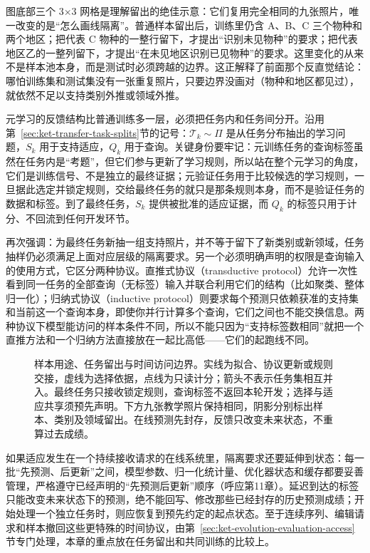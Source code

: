 图底部三个 3×3 网格是理解留出的绝佳示意：它们复用完全相同的九张照片，唯一改变的是“怎么画线隔离”。普通样本留出后，训练里仍含 A、B、C 三个物种和两个地区；把代表 C 物种的一整行留下，才提出“识别未见物种”的要求；把代表地区乙的一整列留下，才提出“在未见地区识别已见物种”的要求。这里变化的从来不是样本池本身，而是测试时必须跨越的边界。这正解释了前面那个反直觉结论：哪怕训练集和测试集没有一张重复照片，只要边界没画对（物种和地区都见过），就依然不足以支持类别外推或领域外推。

元学习的反馈结构比普通训练多一层，必须把任务内和任务间分开。沿用第~\ref{sec:ket-transfer-task-splits}节的记号：$\mathcal T_k\sim\Pi$ 是从任务分布抽出的学习问题，$S_k$ 用于支持适应，$Q_k$ 用于查询。关键身份要牢记：元训练任务的查询标签虽然在任务内是“考题”，但它们参与更新了学习规则，所以站在整个元学习的角度，它们是训练信号、不是独立的最终证据；元验证任务用于比较候选的学习规则，一旦据此选定并锁定规则，交给最终任务的就只是那条规则本身，而不是验证任务的数据和标签。到了最终任务，$S_k$ 提供被批准的适应证据，而 $Q_k$ 的标签只用于计分、不回流到任何开发环节。

再次强调：为最终任务新抽一组支持照片，并不等于留下了新类别或新领域，任务抽样仍必须满足上面对应层级的隔离要求。另一个必须明确声明的权限是查询输入的使用方式，它区分两种协议。直推式协议（transductive protocol）允许一次性看到同一任务的全部查询（无标签）输入并联合利用它们的结构（比如聚类、整体归一化）；归纳式协议（inductive protocol）则要求每个预测只依赖获准的支持集和当前这一个查询本身，即使你并行计算多个查询，它们之间也不能交换信息。两种协议下模型能访问的样本条件不同，所以不能只因为“支持标签数相同”就把一个直推方法和一个归纳方法直接放在一起比高低——它们的起跑线不同。

\begin{figure}[htbp]
  \centering
  
  \caption{样本用途、任务留出与时间访问边界。实线为拟合、协议更新或规则交接，虚线为选择依据，点线为只读计分；箭头不表示任务集相互并入。最终任务只接收锁定规则，查询标签不返回本轮开发；选择与适应共享须预先声明。下方九张教学照片保持相同，阴影分别标出样本、类别及领域留出。在线预测先封存，反馈只改变未来状态，不重算过去成绩。}
  \label{fig:ket-evaluation-boundaries}
\end{figure}
\FloatBarrier

如果适应发生在一个持续接收请求的在线系统里，隔离要求还要延伸到状态：每一批“先预测、后更新”之间，模型参数、归一化统计量、优化器状态和缓存都要妥善管理，严格遵守已经声明的“先预测后更新”顺序（呼应第11章）。延迟到达的标签只能改变未来状态下的预测，绝不能回写、修改那些已经封存的历史预测成绩；开始处理一个独立任务时，则应恢复到预先约定的起点状态。至于连续序列、编辑请求和样本撤回这些更特殊的时间协议，由第~\ref{sec:ket-evolution-evaluation-access}节专门处理，本章的重点放在任务留出和共同训练的比较上。

